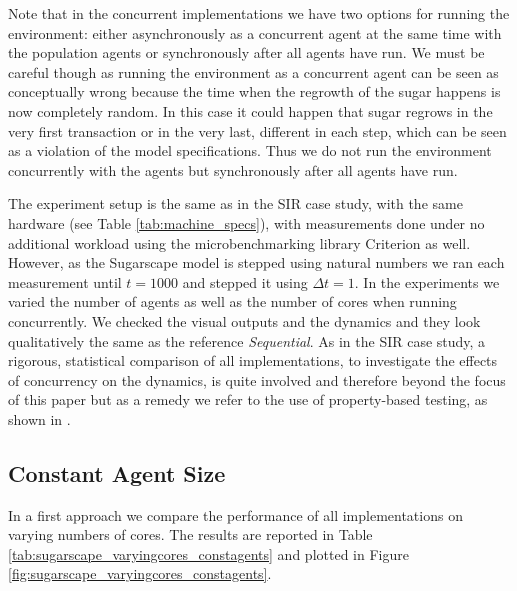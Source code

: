 Note that in the concurrent implementations we have two options for running the environment: either asynchronously as a concurrent agent at the same time with the population agents or synchronously after all agents have run. We must be careful though as running the environment as a concurrent agent can be seen as conceptually wrong because the time when the regrowth of the sugar happens is now completely random. In this case it could happen that sugar regrows in the very first transaction or in the very last, different in each step, which can be seen as a violation of the model specifications. Thus we do not run the environment concurrently with the agents but synchronously after all agents have run.

\medskip

The experiment setup is the same as in the SIR case study, with the same hardware (see Table \ref{tab:machine_specs}), with measurements done under no additional workload using the microbenchmarking library Criterion \cite{criterion_serpentine, criterion_hackage} as well. However, as the Sugarscape model is stepped using natural numbers we ran each measurement until $t = 1000$ and stepped it using $\Delta t = 1$. In the experiments we varied the number of agents as well as the number of cores when running concurrently. We checked the visual outputs and the dynamics and they look qualitatively the same as the reference \textit{Sequential}. As in the SIR case study, a rigorous, statistical comparison of all implementations, to investigate the effects of concurrency on the dynamics, is quite involved and therefore beyond the focus of this paper but as a remedy we refer to the use of property-based testing, as shown in \cite{thaler_show_2019}.


\subsection{Constant Agent Size}
In a first approach we compare the performance of all implementations on varying numbers of cores. The results are reported in Table \ref{tab:sugarscape_varyingcores_constagents} and plotted in Figure \ref{fig:sugarscape_varyingcores_constagents}. 

